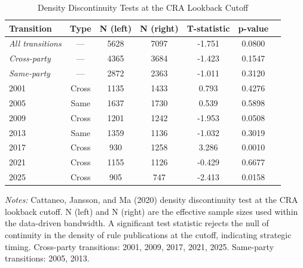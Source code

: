\begin{table}[H]
\centering
\caption{Density Discontinuity Tests at the CRA Lookback Cutoff}
\label{tab:density}
\begin{threeparttable}
\begin{tabular}{lcccccc}
\toprule
Transition & Type & N (left) & N (right) & T-statistic & p-value \\
\midrule
\textit{All transitions} & --- & 5628 & 7097 & -1.751 & 0.0800 \\
\textit{Cross-party} & --- & 4365 & 3684 & -1.423 & 0.1547 \\
\textit{Same-party} & --- & 2872 & 2363 & -1.011 & 0.3120 \\
\midrule
2001 & Cross & 1135 & 1433 & 0.793 & 0.4276 \\
2005 & Same & 1637 & 1730 & 0.539 & 0.5898 \\
2009 & Cross & 1201 & 1242 & -1.953 & 0.0508 \\
2013 & Same & 1359 & 1136 & -1.032 & 0.3019 \\
2017 & Cross & 930 & 1258 & 3.286 & 0.0010 \\
2021 & Cross & 1155 & 1126 & -0.429 & 0.6677 \\
2025 & Cross & 905 & 747 & -2.413 & 0.0158 \\
\bottomrule
\end{tabular}
\begin{tablenotes}[flushleft]
\small
\item \textit{Notes:} Cattaneo, Jansson, and Ma (2020) density discontinuity test at the CRA lookback cutoff. N (left) and N (right) are the effective sample sizes used within the data-driven bandwidth. A significant test statistic rejects the null of continuity in the density of rule publications at the cutoff, indicating strategic timing. Cross-party transitions: 2001, 2009, 2017, 2021, 2025. Same-party transitions: 2005, 2013.
\end{tablenotes}
\end{threeparttable}
\end{table}
